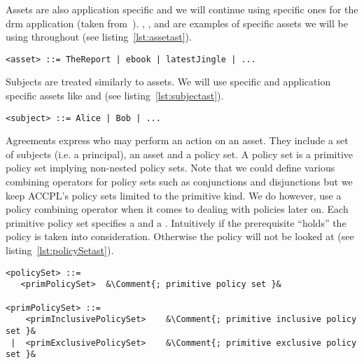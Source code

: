 Assets are also application specific and we will continue using specific ones for the \ac{drm} application (taken from~\cite{pucella2006}). , , and  are examples of specific assets we will be using throughout (see listing~\ref{lst:assetast}). 

\lstset{mathescape, language=AST}  
\begin{lstlisting}[frame=single, caption={asset},label={lst:assetast}]
<asset> ::= TheReport | ebook | latestJingle | ...
\end{lstlisting}

Subjects are treated similarly to assets. We will use specific and application specific assets like  and  (see listing~\ref{lst:subjectast}).

\lstset{mathescape, language=AST}  
\begin{lstlisting}[frame=single, caption={subject},label={lst:subjectast}]
<subject> ::= Alice | Bob | ...
\end{lstlisting}

Agreements express who may perform an action on an asset. They include a set of subjects (i.e. a principal), an asset and a policy set. A policy set is a primitive policy set implying non-nested policy sets. Note that we could define various combining operators for policy sets such as conjunctions and disjunctions but we keep \ac{ACCPL}'s policy sets limited to the primitive kind. We do however, use a policy combining operator when it comes to dealing with policies later on. Each primitive policy set specifies a  and a . Intuitively if the prerequisite ``holds'' the policy is taken into consideration. Otherwise the policy will not be looked at (see listing~\ref{lst:policySetast}).


\newcommand*{\Comment}[1]{\hfill\makebox[7.0cm][l]{#1}}%
\lstset{mathescape, language=AST, escapechar=\&}  
\begin{minipage}[c]{0.95\textwidth}
\begin{lstlisting}[frame=single, caption={policySet and primPolicySet},label={lst:policySetast}]
<policySet> ::=  
   <primPolicySet>	&\Comment{; primitive policy set }&
   
<primPolicySet> ::=  
    <primInclusivePolicySet>	&\Comment{; primitive inclusive policy set }&
 |  <primExclusivePolicySet>	&\Comment{; primitive exclusive policy set }&
\end{lstlisting}
\end{minipage}

